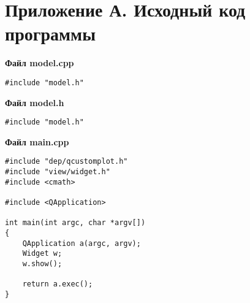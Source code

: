 \documentclass[14pt,a4paper]{extreport}
\begin{document}
\newpage
\chapter*{Приложение А. Исходный код программы}


\textbf{Файл model.cpp}
\begin{alltt}
\begin{verbatim}
#include "model.h"

\end{verbatim}
\end{alltt}

\textbf{Файл model.h}
\begin{alltt}
\begin{verbatim}
#include "model.h"

\end{verbatim}
\end{alltt}

\textbf{Файл main.cpp}
\begin{alltt}
\begin{verbatim}
#include "dep/qcustomplot.h"
#include "view/widget.h"
#include <cmath>

#include <QApplication>

int main(int argc, char *argv[])
{
    QApplication a(argc, argv);
    Widget w;
    w.show();

    return a.exec();
}    
\end{verbatim}
\end{alltt}
\end{document}
